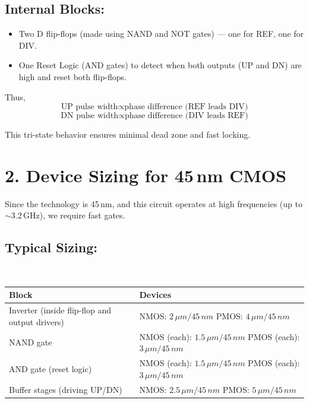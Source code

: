 \begin{itemize}
\subsection*{Internal Blocks:}
\begin{itemize}
    \item Two D flip-flops (made using NAND and NOT gates) — one for REF, one for DIV.
    \item One Reset Logic (AND gates) to detect when both outputs (UP and DN) are high and reset both flip-flops.
\end{itemize}

Thus,
\[
\text{UP pulse width} \propto \text{phase difference (REF leads DIV)}
\]
\[
\text{DN pulse width} \propto \text{phase difference (DIV leads REF)}
\]

This tri-state behavior ensures minimal dead zone and fast locking.

\section*{2. Device Sizing for 45\,nm CMOS}

Since the technology is 45\,nm, and this circuit operates at high frequencies (up to $\sim$3.2\,GHz), we require fast gates.

\subsection*{Typical Sizing:}

\begin{center}
\
\begin{tabular}{|>{\raggedright\arraybackslash}p{5cm}|>{\raggedright\arraybackslash}p{8cm}|}
\hline
\textbf{Block} & \textbf{Devices} \\ \hline
Inverter (inside flip-flop and output drivers) & NMOS: $2\,\mu m/45\,nm$ \newline PMOS: $4\,\mu m/45\,nm$ \\ \hline
NAND gate & NMOS (each): $1.5\,\mu m/45\,nm$ \newline PMOS (each): $3\,\mu m/45\,nm$ \\ \hline
AND gate (reset logic) & NMOS (each): $1.5\,\mu m/45\,nm$ \newline PMOS (each): $3\,\mu m/45\,nm$ \\ \hline
Buffer stages (driving UP/DN) & NMOS: $2.5\,\mu m/45\,nm$ \newline PMOS: $5\,\mu m/45\,nm$ \\ \hline
\end{tabular}
\end{center}


\end{itemize}
